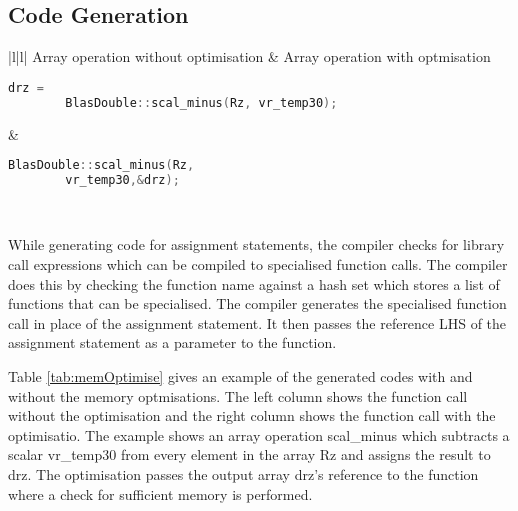 \subsection{Code Generation}

\begin{table}
  \begin{tabular}{|l|l|}
  \hline
  Array operation without optimisation & 
Array operation with optmisation 
   \\
  \hhline{|=|=|}
  
  {
  \begin{lstlisting}[language=c,frame=none, numbers=none]
	drz = 
		BlasDouble::scal_minus(Rz, vr_temp30);
  \end{lstlisting}
  } &
   {
   \begin{lstlisting}[language=c,frame=none, numbers=none]
	 BlasDouble::scal_minus(Rz, 
		vr_temp30,&drz);
   \end{lstlisting}
   } \\
   \hline
   \end{tabular}
   \caption[Generated code with and without memory optimisations]{Table shows the generated code with and without memory optimisations}
   \label{tab:memOptimise}
   \end{table}
While generating code for assignment statements, the compiler checks for library call expressions which can be compiled to specialised function calls. The compiler does this by checking the function name against a hash set which stores a list of functions that can be specialised. The compiler generates the specialised function call in place of the assignment statement. It then passes the reference LHS of the assignment statement as a parameter to the function. 

Table \ref{tab:memOptimise} gives an example of the generated codes with and without the memory optmisations. The left column shows the function call without the optimisation and the right column shows the function call with the optimisatio. The example shows an array operation scal\_minus which subtracts a scalar vr\_temp30 from every element in the array Rz and assigns the result to drz.  The optimisation passes the output array drz's reference to the function where a check for sufficient memory is performed.
